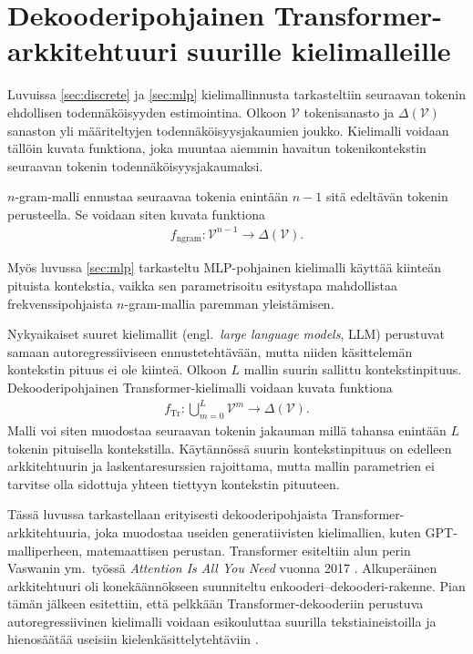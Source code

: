 \section{Dekooderipohjainen Transformer-arkkitehtuuri suurille
kielimalleille}

Luvuissa \ref{sec:discrete} ja \ref{sec:mlp} kielimallinnusta
tarkasteltiin seuraavan tokenin ehdollisen todennäköisyyden estimointina.
Olkoon \(\mathcal{V}\) tokenisanasto ja
\(\Delta(\mathcal{V})\) sanaston yli määriteltyjen
todennäköisyysjakaumien joukko. Kielimalli voidaan tällöin kuvata
funktiona, joka muuntaa aiemmin havaitun tokenikontekstin seuraavan
tokenin todennäköisyysjakaumaksi.

\(n\)-gram-malli ennustaa seuraavaa tokenia enintään \(n-1\)
sitä edeltävän tokenin perusteella. Se voidaan siten kuvata funktiona
\begin{align*}
  f_{\mathrm{ngram}}
  \colon
  \mathcal{V}^{n-1}
  \to
  \Delta(\mathcal{V}).
\end{align*}

Myös luvussa \ref{sec:mlp} tarkasteltu MLP-pohjainen kielimalli käyttää
kiinteän pituista kontekstia, vaikka sen parametrisoitu esitystapa
mahdollistaa frekvenssipohjaista \(n\)-gram-mallia paremman
yleistämisen.

Nykyaikaiset suuret kielimallit
(engl.\ \emph{large language models}, LLM) perustuvat samaan
autoregressiiviseen ennustetehtävään, mutta niiden käsittelemän
kontekstin pituus ei ole kiinteä. Olkoon \(L\) mallin suurin sallittu
kontekstinpituus. Dekooderipohjainen Transformer-kielimalli voidaan
kuvata funktiona
\begin{align*}
  f_{\mathrm{Tr}}
  \colon
  \bigcup_{m=0}^{L}\mathcal{V}^{m}
  \to
  \Delta(\mathcal{V}).
\end{align*}
Malli voi siten muodostaa seuraavan tokenin jakauman millä tahansa
enintään \(L\) tokenin pituisella kontekstilla. Käytännössä suurin
kontekstinpituus on edelleen arkkitehtuurin ja laskentaresurssien
rajoittama, mutta mallin parametrien ei tarvitse olla sidottuja yhteen
tiettyyn kontekstin pituuteen.

Tässä luvussa tarkastellaan erityisesti dekooderipohjaista
Transformer-arkkitehtuuria, joka muodostaa useiden generatiivisten
kielimallien, kuten GPT-malliperheen, matemaattisen perustan.
Transformer esiteltiin alun perin Vaswanin ym.\ työssä
\emph{Attention Is All You Need} vuonna 2017
\cite{vaswani2017attention}. Alkuperäinen arkkitehtuuri oli
konekäännökseen suunniteltu enkooderi--dekooderi-rakenne. Pian tämän jälkeen esitettiin, että pelkkään Transformer-dekooderiin perustuva autoregressiivinen kielimalli voidaan esikouluttaa suurilla tekstiaineistoilla ja hienosäätää useisiin kielenkäsittelytehtäviin \cite{radford2018improving}.

